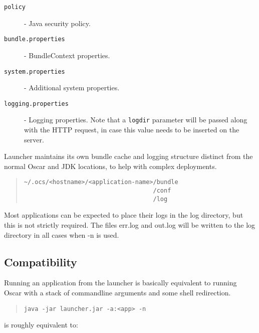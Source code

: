 \documentclass{report}
\begin{document}
\begin{description}
\item[\tt policy] - Java security policy. 
\item[\tt bundle.properties] - BundleContext properties. 
\item[\tt system.properties]  - Additional system 
        properties. 
\item[\tt logging.properties] - Logging properties. Note that a 
        {\tt logdir} parameter will be passed along with the HTTP request, in case 
        this value needs to be inserted on the server.
\end{description}

\noindent Launcher maintains its own bundle cache and logging structure distinct from
the normal Oscar and JDK locations, to help with complex deployments.

\begin{quote}\begin{scriptsize}\begin{verbatim}    
~/.ocs/<hostname>/<application-name>/bundle
                                    /conf
                                    /log
\end{verbatim}\end{scriptsize}\end{quote}

\noindent    Most applications can be expected to place their logs in the log directory,
    but this is not strictly required. The files err.log and out.log will be 
    written to the log directory in all cases when -n is used.

\subsection{Compatibility}
    Running an application from the launcher is basically equivalent to running 
    Oscar with a stack of commandline arguments and some shell redirection.
    
\begin{quote}\begin{scriptsize}\begin{verbatim}    
java -jar launcher.jar -a:<app> -n
\end{verbatim}\end{scriptsize}\end{quote}
        
    is roughly equivalent to:
    
\end{document}
